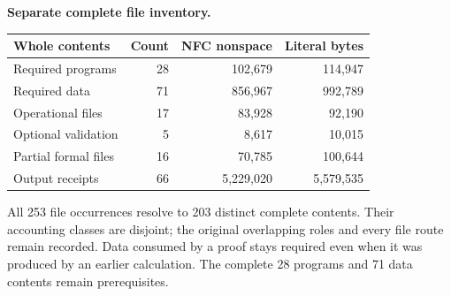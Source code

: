\documentclass[11pt,a4paper]{article}
\begin{document}
\textbf{Separate complete file inventory.}
\begin{center}\small\begin{tabular}{lrrr}\toprule
Whole contents & Count & NFC nonspace & Literal bytes\\\midrule
Required programs & 28 & 102,679 & 114,947\\
Required data & 71 & 856,967 & 992,789\\
Operational files & 17 & 83,928 & 92,190\\
Optional validation & 5 & 8,617 & 10,015\\
Partial formal files & 16 & 70,785 & 100,644\\
Output receipts & 66 & 5,229,020 & 5,579,535\\
\bottomrule\end{tabular}\end{center}
All 253 file occurrences resolve to 203 distinct complete contents. Their accounting classes are disjoint; the original overlapping roles and every file route remain recorded. Data consumed by a proof stays required even when it was produced by an earlier calculation. The complete 28 programs and 71 data contents remain prerequisites.
\end{document}
